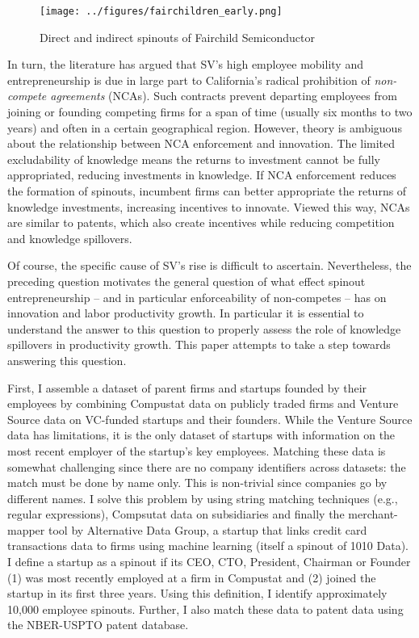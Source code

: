 \documentclass[12pt,english]{article}
\theoremstyle{remark}
\begin{document}
\begin{figure}	
	\center
	\texttt{[image: ../figures/fairchildren\_early.png]}
	\caption{Direct and indirect spinouts of Fairchild Semiconductor}
	\label{fairchild_spinouts}
\end{figure}



In turn, the literature has argued that SV's high employee mobility and entrepreneurship is due in large part to California's radical prohibition of \textit{non-compete agreements} (NCAs). Such contracts prevent departing employees from joining or founding competing firms for a span of time (usually six months to two years) and often in a certain geographical region. However, theory is ambiguous about the relationship between NCA enforcement and innovation. The limited excludability of knowledge means the returns to investment cannot be fully appropriated, reducing investments in knowledge. If NCA enforcement reduces the formation of spinouts, incumbent firms can better appropriate the returns of knowledge investments, increasing incentives to innovate. Viewed this way, NCAs are similar to patents, which also create incentives while reducing competition and knowledge spillovers.

Of course, the specific cause of SV's rise is difficult to ascertain. Nevertheless, the preceding question motivates the general question of what effect spinout entrepreneurship -- and in particular enforceability of non-competes -- has on innovation and labor productivity growth. In particular it is essential to understand the answer to this question to properly assess the role of knowledge spillovers in productivity growth. This paper attempts to take a step towards answering this question.

First, I assemble a dataset of parent firms and startups founded by their employees by combining Compustat data on publicly traded firms and Venture Source data on VC-funded startups and their founders. While the Venture Source data has limitations, it is the only dataset of startups with information on the most recent employer of the startup's key employees. Matching these data is somewhat challenging since there are no company identifiers across datasets: the match must be done by name only. This is non-trivial since companies go by different names. I solve this problem by using string matching techniques (e.g., regular expressions), Compsutat data on subsidiaries and finally the merchant-mapper tool by Alternative Data Group, a startup that links credit card transactions data to firms using machine learning (itself a spinout of 1010 Data). I define a startup as a spinout if its CEO, CTO, President, Chairman or Founder (1) was most recently employed at a firm in Compustat and (2) joined the startup in its first three years. Using this definition, I identify approximately 10,000 employee spinouts. Further, I also match these data to patent data using the NBER-USPTO patent database. 
\end{document}
